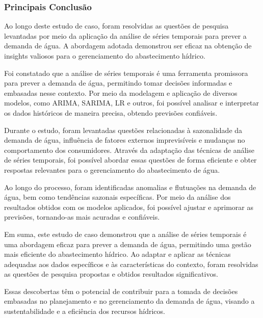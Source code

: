 \subsubsection{Principais Conclus\~ao}


Ao longo deste estudo de caso, foram resolvidas as questões de pesquisa levantadas por meio da aplicação da análise de séries temporais para prever a demanda de água. A abordagem adotada demonstrou ser eficaz na obtenção de insights valiosos para o gerenciamento do abastecimento hídrico.

Foi constatado que a análise de séries temporais é uma ferramenta promissora para prever a demanda de água, permitindo tomar decisões informadas e embasadas nesse contexto. Por meio da modelagem e aplicação de diversos modelos, como ARIMA, SARIMA, LR e outros, foi possível analisar e interpretar os dados históricos de maneira precisa, obtendo previsões confiáveis.

Durante o estudo, foram levantadas questões relacionadas à sazonalidade da demanda de água, influência de fatores externos imprevisíveis e mudanças no comportamento dos consumidores. Através da adaptação das técnicas de análise de séries temporais, foi possível abordar essas questões de forma eficiente e obter respostas relevantes para o gerenciamento do abastecimento de água.

Ao longo do processo, foram identificadas anomalias e flutuações na demanda de água, bem como tendências sazonais específicas. Por meio da análise dos resultados obtidos com os modelos aplicados, foi possível ajustar e aprimorar as previsões, tornando-as mais acuradas e confiáveis.

Em suma, este estudo de caso demonstrou que a análise de séries temporais é uma abordagem eficaz para prever a demanda de água, permitindo uma gestão mais eficiente do abastecimento hídrico. Ao adaptar e aplicar as técnicas adequadas aos dados específicos e às características do contexto, foram resolvidas as questões de pesquisa propostas e obtidos resultados significativos.

Essas descobertas têm o potencial de contribuir para a tomada de decisões embasadas no planejamento e no gerenciamento da demanda de água, visando a sustentabilidade e a eficiência dos recursos hídricos.

